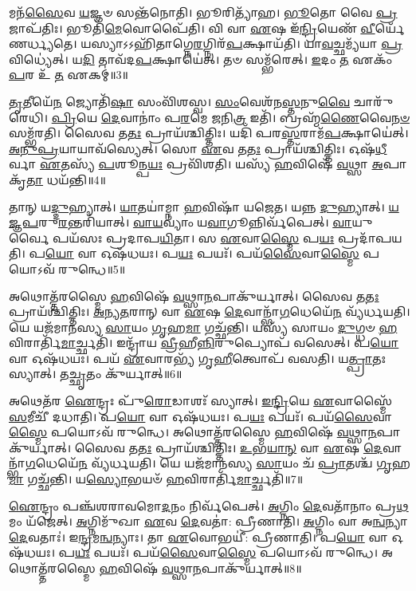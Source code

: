 𑌮𑌨᳴\-\ul{𑌸𑍈}\-𑌵 \ul{𑌯}\-𑌜𑍍𑌞𑍞 𑌸𑌨𑍍𑌤᳴𑌨𑍋𑌤𑌿।
𑌭𑍂𑌰𑌿𑌤𑍍𑌯𑌾᳴𑌹।
\-\ul{𑌭𑍂}\-𑌤𑍋 𑌵𑍈 \ul{𑌪𑍍𑌰}\-𑌜𑌾\-𑌪᳴𑌤𑌿𑌃।
𑌭𑍂𑌤𑌿᳴\-\ul{𑌮𑍇}\-𑌵𑍋𑌪𑍈᳴𑌤𑌿।
𑌵𑌿 𑌵𑌾 \ul{𑌏}\-𑌷 𑌇᳴\-\ul{𑌨𑍍𑌦𑍍𑌰𑌿}\-𑌯𑍇𑌣᳴ \ul{𑌵𑍀}\-𑌰𑍍𑌯𑍇᳴𑌣𑌰𑍍𑌧𑍍𑌯𑌤𑍇।
𑌯𑌸𑍍𑌯𑌾𑌽𑌽𑌹𑌿᳴𑌤𑌾𑌗𑍍𑌨𑍇\-\ul{𑌰}\-𑌗𑍍𑌨𑌿𑌰᳴\-\ul{𑌪}\-𑌕𑍍𑌷𑌾𑌯᳴𑌤𑌿।
𑌯𑌾\-\ul{𑌵}\-𑌚𑍍𑌛𑌮𑍍𑌯᳴𑌯𑌾 \ul{𑌪𑍍𑌰}\-𑌵𑌿𑌧𑍍𑌯𑍇॑𑌤𑍍।
𑌯\-\ul{𑌦𑌿} 𑌤𑌾𑌵᳴𑌦\-\ul{𑌪}\-𑌕𑍍𑌷𑌾𑌯𑍇॑𑌤𑍍।
𑌤𑍞 𑌸𑌮𑍍𑌭᳴𑌰𑍇𑌤𑍍।
\-\ul{𑌇}\-𑌦𑌂 \ul{𑌤} 𑌏𑌕𑌂᳴ \ul{𑌪}\-𑌰 𑌉᳴ \ul{𑌤} 𑌏𑌕𑌮𑍍॑॥3॥

\-\ul{𑌤𑍃}\-𑌤𑍀𑌯𑍇᳴\-\ul{𑌨} 𑌜𑍍𑌯𑍋𑌤𑌿᳴\-\ul{𑌷𑌾} 𑌸𑌂𑌵𑌿᳴𑌶𑌸𑍍𑌵।
\-\ul{𑌸𑌂}\-𑌵𑍇𑌶᳴𑌨\-\ul{𑌸𑍍𑌤}\-𑌨𑍁\-\ul{𑌵𑍈} 𑌚𑌾𑌰𑍁᳴𑌰𑍇𑌧𑌿।
\-\ul{𑌪𑍍𑌰𑌿}\-𑌯𑍇 \ul{𑌦𑍇}\-𑌵𑌾𑌨𑌾𑌂॑ 𑌪\-\ul{𑌰}\-𑌮𑍇 \ul{𑌜}\-𑌨𑌿\-\ul{𑌤𑍍𑌰} 𑌇𑌤𑌿᳴।
𑌬𑍍𑌰𑌹𑍍𑌮᳴\-\ul{𑌣𑍈}\-𑌵𑍈\-\ul{𑌨}\-\-\ul{𑍞} 𑌸𑌮𑍍𑌭᳴𑌰𑌤𑌿।
𑌸𑍈𑌵 𑌤\-\ul{𑌤𑌃} 𑌪𑍍𑌰𑌾𑌯᳴𑌶𑍍𑌚𑌿𑌤𑍍𑌤𑌿𑌃।
𑌯𑌦𑌿᳴ 𑌪𑌰\-\ul{𑌸𑍍𑌤}\-𑌰𑌾𑌮᳴\-\ul{𑌪}\-𑌕𑍍𑌷𑌾𑌯𑍇॑𑌤𑍍।
\-\ul{𑌅}\-\-\ul{𑌨𑍁}\-\-\ul{𑌪𑍍𑌰}\-𑌯𑌾𑌯𑌾𑌵᳴𑌸𑍍𑌯𑍇𑌤𑍍।
𑌸𑍋 \ul{𑌏}\-𑌵 𑌤\-\ul{𑌤𑌃} 𑌪𑍍𑌰𑌾𑌯᳴𑌶𑍍𑌚𑌿𑌤𑍍𑌤𑌿𑌃।
𑌓𑌷᳴\-\ul{𑌧𑍀}\-𑌰𑍍𑌵𑌾 \ul{𑌏}\-𑌤𑌸𑍍𑌯᳴ \ul{𑌪}\-𑌶𑍂𑌨𑍍𑌪\-\ul{𑌯𑌃} 𑌪𑍍𑌰𑌵𑌿᳴𑌶𑌤𑌿।
𑌯𑌸𑍍𑌯᳴ \ul{𑌹}\-𑌵𑌿𑌷𑍇᳴ \ul{𑌵}\-𑌥𑍍𑌸𑌾 \ul{𑌅}\-𑌪𑌾𑌕𑍃᳴\-\ul{𑌤𑌾} 𑌧𑌯᳴𑌨𑍍𑌤𑌿॥4॥

𑌤𑌾𑌨𑍍 𑌯\-\ul{𑌦𑍍𑌦𑍁}\-𑌹𑍍𑌯𑌾𑌤𑍍।
\-\ul{𑌯𑌾}\-𑌤𑌯𑌾॑𑌮𑍍𑌨𑌾 \ul{𑌹}\-𑌵𑌿𑌷𑌾᳴ 𑌯𑌜𑍇𑌤।
𑌯𑌨𑍍𑌨 \ul{𑌦𑍁}\-𑌹𑍍𑌯𑌾𑌤𑍍।
\-\ul{𑌯}\-\-\ul{𑌜𑍍𑌞}\-\-\ul{𑌪}\-𑌰𑍁\-\ul{𑌰}\-𑌨𑍍𑌤𑌰𑌿᳴𑌯𑌾𑌤𑍍।
\-\ul{𑌵𑌾}\-\-\ul{𑌯}\-𑌵𑍍𑌯𑌾𑌂॑ 𑌯\-\ul{𑌵𑌾}\-𑌗𑍂𑌨𑍍𑌨𑌿𑌰𑍍𑌵᳴𑌪𑍇𑌤𑍍।
\-\ul{𑌵𑌾}\-𑌯𑍁𑌰𑍍𑌵𑍈 𑌪𑌯᳴𑌸𑌃 𑌪𑍍𑌰𑌦𑌾𑌪\-\ul{𑌯𑌿}\-𑌤𑌾।
𑌸 \ul{𑌏}\-𑌵𑌾\-\ul{𑌸𑍍𑌮𑍈} 𑌪\-\ul{𑌯𑌃} 𑌪𑍍𑌰𑌦𑌾᳴𑌪𑌯𑌤𑌿।
𑌪\-\ul{𑌯𑍋} 𑌵𑌾 𑌓𑌷᳴𑌧𑌯𑌃।
𑌪\-\ul{𑌯𑌃} 𑌪𑌯𑌃᳴।
𑌪𑌯᳴\-\ul{𑌸𑍈}\-𑌵𑌾\-\ul{𑌸𑍍𑌮𑍈} 𑌪𑌯𑍋\-𑌽𑌵᳴ 𑌰𑍁𑌨𑍍𑌧𑍇॥5॥

𑌅𑌥𑍋𑌤𑍍𑌤᳴𑌰𑌸𑍍𑌮𑍈 \ul{𑌹}\-𑌵𑌿𑌷𑍇᳴ \ul{𑌵}\-𑌥𑍍𑌸𑌾\-\ul{𑌨}\-𑌪𑌾𑌕𑍁᳴𑌰𑍍𑌯𑌾𑌤𑍍।
𑌸𑍈𑌵 𑌤\-\ul{𑌤𑌃} 𑌪𑍍𑌰𑌾𑌯᳴𑌶𑍍𑌚𑌿𑌤𑍍𑌤𑌿𑌃।
\-\ul{𑌅}\-\-\ul{𑌨𑍍𑌯}\-\-\ul{𑌤}\-𑌰𑌾𑌨𑍍 𑌵𑌾 \ul{𑌏}\-𑌷 \ul{𑌦𑍇}\-𑌵𑌾𑌨𑍍𑌭𑌾᳴\-\ul{𑌗}\-𑌧𑍇𑌯𑍇᳴\-\ul{𑌨} 𑌵𑍍𑌯᳴𑌰𑍍𑌧𑌯𑌤𑌿।
𑌯𑍇 𑌯𑌜᳴𑌮𑌾𑌨𑌸𑍍𑌯 \ul{𑌸𑌾}\-𑌯𑌂 \ul{𑌗𑍃}\-𑌹\-\ul{𑌮𑌾} 𑌗𑌚𑍍𑌛᳴𑌨𑍍𑌤𑌿।
𑌯𑌸𑍍𑌯᳴ 𑌸𑌾𑌯𑌂 \ul{𑌦𑍁}\-𑌗𑍍𑌧𑍞 \ul{𑌹}\-𑌵𑌿𑌰𑌾𑌰𑍍𑌤𑌿᳴\-\ul{𑌮𑌾}\-𑌰𑍍𑌚𑍍𑌛𑌤𑌿᳴।
𑌇𑌨𑍍𑌦𑍍𑌰𑌾᳴𑌯 \ul{𑌵𑍍𑌰𑍀}\-𑌹𑍀\-\ul{𑌨𑍍𑌨𑌿}\-𑌰𑍁𑌪𑍍𑌯𑍋𑌪᳴ 𑌵𑌸𑍇𑌤𑍍।
𑌪\-\ul{𑌯𑍋} 𑌵𑌾 𑌓𑌷᳴𑌧𑌯𑌃।
𑌪𑌯᳴ \ul{𑌏}\-𑌵𑌾𑌰𑌭𑍍𑌯᳴ 𑌗𑍃\-\ul{𑌹𑍀}\-𑌤𑍍𑌵𑍋𑌪᳴ 𑌵𑌸𑌤𑌿।
𑌯\-\ul{𑌤𑍍𑌪𑍍𑌰𑌾}\-𑌤𑌃 𑌸𑍍𑌯𑌾𑌤𑍍।
𑌤\-\ul{𑌚𑍍𑌛𑍃}\-𑌤𑌂 𑌕𑍁᳴𑌰𑍍𑌯𑌾𑌤𑍍॥6॥

𑌅𑌥𑍇𑌤᳴𑌰 \ul{𑌐}\-𑌨𑍍𑌦𑍍𑌰𑌃 𑌪𑍁᳴\-\ul{𑌰𑍋}\-𑌡𑌾𑌶𑌃᳴ 𑌸𑍍𑌯𑌾𑌤𑍍।
\-\ul{𑌇}\-\-\ul{𑌨𑍍𑌦𑍍𑌰𑌿}\-𑌯𑍇 \ul{𑌏}\-𑌵𑌾𑌸𑍍𑌮𑍈᳴ \ul{𑌸}\-𑌮𑍀𑌚𑍀᳴ 𑌦𑌧𑌾𑌤𑌿।
𑌪\-\ul{𑌯𑍋} 𑌵𑌾 𑌓𑌷᳴𑌧𑌯𑌃।
𑌪\-\ul{𑌯𑌃} 𑌪𑌯𑌃᳴।
𑌪𑌯᳴\-\ul{𑌸𑍈}\-𑌵𑌾\-\ul{𑌸𑍍𑌮𑍈} 𑌪𑌯𑍋\-𑌽𑌵᳴ 𑌰𑍁𑌨𑍍𑌧𑍇।
𑌅𑌥𑍋𑌤𑍍𑌤᳴𑌰𑌸𑍍𑌮𑍈 \ul{𑌹}\-𑌵𑌿𑌷𑍇᳴ \ul{𑌵}\-𑌥𑍍𑌸𑌾\-\ul{𑌨}\-𑌪𑌾𑌕𑍁᳴𑌰𑍍𑌯𑌾𑌤𑍍।
𑌸𑍈𑌵 𑌤\-\ul{𑌤𑌃} 𑌪𑍍𑌰𑌾𑌯᳴𑌶𑍍𑌚𑌿𑌤𑍍𑌤𑌿𑌃।
\-\ul{𑌉}\-𑌭\-\ul{𑌯𑌾}\-\-\ul{𑌨𑍍} 𑌵𑌾 \ul{𑌏}\-𑌷 \ul{𑌦𑍇}\-𑌵𑌾𑌨𑍍𑌭𑌾᳴\-\ul{𑌗}\-𑌧𑍇𑌯𑍇᳴\-\ul{𑌨} 𑌵𑍍𑌯᳴𑌰𑍍𑌧𑌯𑌤𑌿।
𑌯𑍇 𑌯𑌜᳴𑌮𑌾𑌨𑌸𑍍𑌯 \ul{𑌸𑌾}\-𑌯𑌂 𑌚᳴ \ul{𑌪𑍍𑌰𑌾}\-𑌤𑌶𑍍𑌚᳴ \ul{𑌗𑍃}\-𑌹\-\ul{𑌮𑌾} 𑌗𑌚𑍍𑌛᳴𑌨𑍍𑌤𑌿।
𑌯\-\ul{𑌸𑍍𑌯𑍋}\-𑌭𑌯𑍞᳴ \ul{𑌹}\-𑌵𑌿𑌰𑌾𑌰𑍍𑌤𑌿᳴\-\ul{𑌮𑌾}\-𑌰𑍍𑌚𑍍𑌛𑌤𑌿᳴॥7॥

\-\ul{𑌐}\-𑌨𑍍𑌦𑍍𑌰𑌂 𑌪𑌞𑍍𑌚᳴𑌶𑌰𑌾𑌵𑌮𑍋\-\ul{𑌦}\-𑌨𑌂 𑌨𑌿𑌰𑍍𑌵᳴𑌪𑍇𑌤𑍍।
\-\ul{𑌅}\-𑌗𑍍𑌨𑌿𑌂 \ul{𑌦𑍇}\-𑌵𑌤𑌾᳴𑌨𑌾𑌂 𑌪𑍍𑌰\-\ul{𑌥}\-𑌮𑌂 𑌯᳴𑌜𑍇𑌤𑍍।
\-\ul{𑌅}\-𑌗𑍍𑌨𑌿𑌮𑍁᳴𑌖𑌾 \ul{𑌏}\-𑌵 \ul{𑌦𑍇}\-𑌵𑌤𑌾॑: 𑌪𑍍𑌰𑍀𑌣𑌾𑌤𑌿।
\-\ul{𑌅}\-𑌗𑍍𑌨𑌿𑌂 𑌵𑌾 𑌅\-\ul{𑌨𑍍𑌵}\-𑌨𑍍𑌯𑌾 \ul{𑌦𑍇}\-𑌵𑌤𑌾𑌃॑।
𑌇\-\ul{𑌨𑍍𑌦𑍍𑌰}\-𑌮\-\ul{𑌨𑍍𑌵}\-𑌨𑍍𑌯𑌾𑌃।
𑌤𑌾 \ul{𑌏}\-𑌵𑍋𑌭𑌯𑍀॑: 𑌪𑍍𑌰𑍀𑌣𑌾𑌤𑌿।
𑌪\-\ul{𑌯𑍋} 𑌵𑌾 𑌓𑌷᳴𑌧𑌯𑌃।
𑌪\-\ul{𑌯𑌃} 𑌪𑌯𑌃᳴।
𑌪𑌯᳴\-\ul{𑌸𑍈}\-𑌵𑌾\-\ul{𑌸𑍍𑌮𑍈} 𑌪𑌯𑍋\-𑌽𑌵᳴ 𑌰𑍁𑌨𑍍𑌧𑍇।
𑌅𑌥𑍋𑌤𑍍𑌤᳴𑌰𑌸𑍍𑌮𑍈 \ul{𑌹}\-𑌵𑌿𑌷𑍇᳴ \ul{𑌵}\-𑌥𑍍𑌸𑌾\-\ul{𑌨}\-𑌪𑌾𑌕𑍁᳴𑌰𑍍𑌯𑌾𑌤𑍍॥8॥

